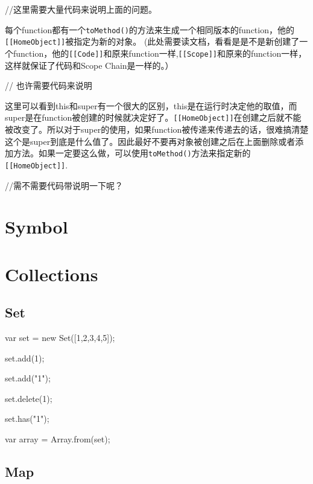 \begin{JavaScript}
//这里需要大量代码来说明上面的问题。
\end{JavaScript}

每个function都有一个\lstinline$toMethod()$的方法来生成一个相同版本的function，他的\lstinline$[[HomeObject]]$被指定为新的对象。
(此处需要读文档，看看是是不是新创建了一个function，他的\lstinline$[[Code]]$和原来function一样,\lstinline$[[Scope]]$和原来的function一样，这样就保证了代码和Scope Chain是一样的。）
\begin{JavaScript}
// 也许需要代码来说明
\end{JavaScript}

这里可以看到this和super有一个很大的区别，this是在运行时决定他的取值，而super是在function被创建的时候就决定好了。\lstinline$[[HomeObject]]$在创建之后就不能被改变了。所以对于super的使用，如果function被传递来传递去的话，很难搞清楚这个是super到底是什么值了。因此最好不要再对象被创建之后在上面删除或者添加方法。如果一定要这么做，可以使用\lstinline$toMethod()$方法来指定新的\lstinline$[[HomeObject]]$.

\begin{JavaScript}
//需不需要代码带说明一下呢？
\end{JavaScript}

\section{Symbol}


\section{Collections}

\subsection{Set}

\begin{JavaScript}

var set = new Set([1,2,3,4,5]);

set.add(1);

set.add("1");

set.delete(1);

set.has("1");

var array = Array.from(set);

\end{JavaScript}


\subsection{Map}

